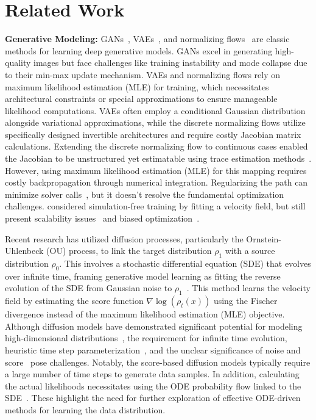 \section{Related Work}
\label{sec:rel}
\textbf{Generative Modeling:} %
GANs~\citep{goodfellow2014generative,arjovsky2017wasserstein}, VAEs~\citep{KingmaICLR2014}, and normalizing flows~\citep{tabak2013family,rezende2015variational,dinh2017density,huang2018neural,durkan2019neural} are classic methods for learning deep generative models. GANs excel in generating high-quality images but face challenges like training instability and mode collapse due to their min-max update mechanism. VAEs and normalizing flows rely on maximum likelihood estimation (MLE) for training, which necessitates architectural constraints or special approximations to ensure manageable likelihood computations. VAEs often employ a conditional Gaussian distribution alongside variational approximations, while the discrete normalizing flows utilize specifically designed invertible architectures and require costly Jacobian matrix calculations. Extending the discrete normalizing flow to continuous cases enabled the Jacobian to be unstructured yet estimatable using trace estimation methods~\citep{hutchinson1989stochastic,ChenARXIV2018,grathwohl2019scalable}. However, using maximum likelihood estimation (MLE) for this mapping requires costly backpropagation through numerical integration. Regularizing the path can minimize solver calls~\citep{finlay2020train,onken2021ot}, but it doesn't resolve the fundamental optimization challenges. \citet{rozen2021moser,ben2022matching} considered simulation-free training by fitting a velocity field, but still present scalability issues~\citep{rozen2021moser} and biased optimization~\citep{ben2022matching}.

Recent research has utilized diffusion processes, particularly the Ornstein-Uhlenbeck (OU) process, to link the target distribution $\rho_1$ with a source distribution $\rho_0$. This involves a stochastic differential equation (SDE) that evolves over infinite time, framing  generative model learning as fitting the reverse evolution of the SDE from Gaussian noise to $\rho_1$~\citep{sohl2015deep,ho2020denoising,SongICLR2021}. This method learns the velocity field by estimating the score function $\nabla \log(\rho_t(x))$ using the Fischer divergence instead of the maximum likelihood estimation (MLE) objective. Although diffusion models have demonstrated significant potential for modeling high-dimensional distributions~\citep{rombach2022high,hoogeboom2022equivariant,saharia2022photorealistic}, the requirement for infinite time evolution, heuristic time step parameterization~\citep{xiao2022tackling}, and the unclear significance of noise and score~\citep{bansal2024cold,lu2022maximum} pose challenges. Notably, the score-based diffusion models typically require a large number of time steps to generate data samples. In addition, calculating the actual likelihoods necessitates using the ODE probability flow linked to the SDE~\citep{SongICLR2021}. These highlight the need for further exploration of effective ODE-driven methods for learning the data distribution.  

